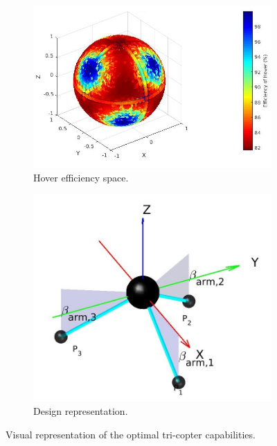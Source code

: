 \begin{figure}[!h]
{\begin{subfigure}[b]{0.4\textwidth}
    \includegraphics[width=\linewidth]{images/Tri_hspace.jpg}
    \caption{Hover efficiency space.} \label{fig:Tricopter_hspace}
  \end{subfigure}
  \hspace*{\fill} %
  \begin{subfigure}[b]{0.4\textwidth}
    \includegraphics[width=\linewidth]{images/Tricopter.jpg}
    \caption{Design representation.} \label{fig:Tricopter_visual}
  \end{subfigure}}
  \caption{Visual representation of the optimal tri-copter capabilities.}
  \label{fig:Tricopter_result}
\end{figure}

